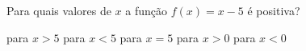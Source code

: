 Para quais valores de $x$ a função $f(x)=x-5$ é positiva?

para $x>5$
para $x<5$
para $x=5$
para $x>0$
para $x<0$


